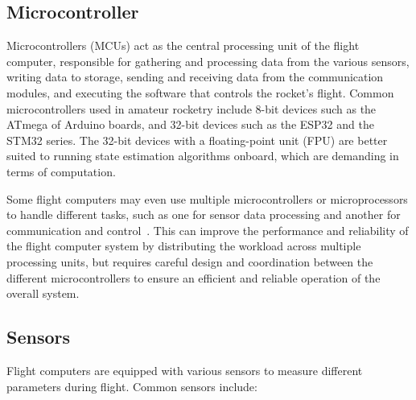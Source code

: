 \subsection{Microcontroller} 

Microcontrollers (MCUs) act as the central processing unit of the flight computer, responsible for gathering and processing data from the various sensors, writing data to storage, sending and receiving data from the communication modules, and executing the software that controls the rocket's flight. Common microcontrollers used in amateur rocketry include 8-bit devices such as the ATmega of Arduino boards, and 32-bit devices such as the ESP32 and the STM32 series. The 32-bit devices with a floating-point unit (FPU) are better suited to running state estimation algorithms onboard, which are demanding in terms of computation.
    
Some flight computers may even use multiple microcontrollers or microprocessors to handle different tasks, such as one for sensor data processing and another for communication and control~\cite{bps:ava}. This can improve the performance and reliability of the flight computer system by distributing the workload across multiple processing units, but requires careful design and coordination between the different microcontrollers to ensure an efficient and reliable operation of the overall system.

\subsection{Sensors} 

Flight computers are equipped with various sensors to measure different parameters during flight. Common sensors include:

